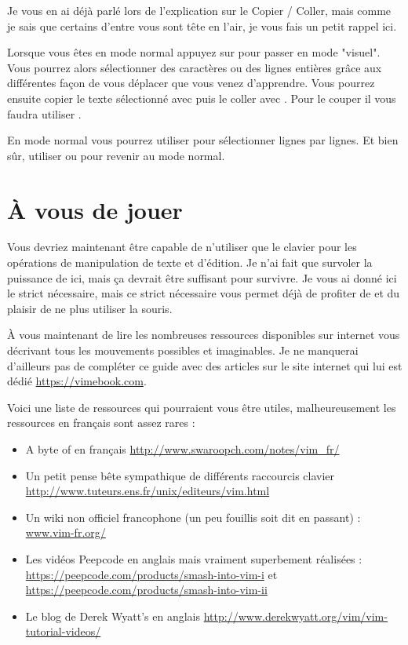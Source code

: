 Je vous en ai déjà parlé lors de l'explication sur le Copier / Coller, mais comme je sais que certains d'entre vous sont tête en l'air, je vous fais un petit rappel ici.

Lorsque vous êtes en mode \og normal \fg{} appuyez sur \ttv pour passer en mode "visuel". Vous pourrez alors sélectionner des caractères ou des lignes entières grâce aux différentes façon de vous déplacer que vous venez d'apprendre. Vous pourrez ensuite copier le texte sélectionné avec \tty\xspace puis le coller avec \ttp. Pour le couper il vous faudra utiliser \ttd.

En mode normal vous pourrez utiliser \ttV pour sélectionner lignes par lignes. Et bien sûr, utiliser \ttesc ou \vimcmd{;;} pour revenir au mode normal.

\section{À vous de jouer}

Vous devriez maintenant être capable de n'utiliser que le clavier pour les opérations de manipulation de texte et d'édition. Je n'ai fait que survoler la puissance de \vim ici, mais ça devrait être suffisant pour survivre. Je vous ai donné ici le strict nécessaire, mais ce strict nécessaire vous permet déjà de profiter de \vim et du plaisir de ne plus utiliser la souris.

À vous maintenant de lire les nombreuses ressources disponibles sur internet vous décrivant tous les mouvements possibles et imaginables. Je ne manquerai d'ailleurs pas de compléter ce guide avec des articles sur le site internet qui lui est dédié \url{https://vimebook.com}.

\bigskip
Voici une liste de ressources qui pourraient vous être utiles, malheureusement les ressources en français sont assez rares :

\begin{itemize}
    \item A byte of \vim en français \url{http://www.swaroopch.com/notes/vim_fr/}
    \item Un petit pense bête sympathique de différents raccourcis clavier \url{http://www.tuteurs.ens.fr/unix/editeurs/vim.html}
    \item Un wiki non officiel francophone (un peu fouillis soit dit en passant) : \url{www.vim-fr.org/}
    \item Les vidéos Peepcode en anglais mais vraiment superbement réalisées : \url{https://peepcode.com/products/smash-into-vim-i} et \url{https://peepcode.com/products/smash-into-vim-ii}
    \item Le blog de Derek Wyatt's en anglais \url{http://www.derekwyatt.org/vim/vim-tutorial-videos/}
\end{itemize}

